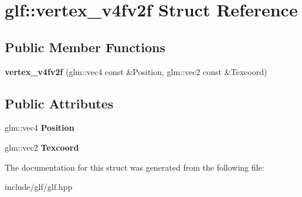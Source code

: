 \hypertarget{structglf_1_1vertex__v4fv2f}{\section{glf\-:\-:vertex\-\_\-v4fv2f \-Struct \-Reference}
\label{structglf_1_1vertex__v4fv2f}
}
\subsection*{\-Public \-Member \-Functions}
\begin{DoxyCompactItemize}
\item 
\hypertarget{structglf_1_1vertex__v4fv2f_a239189352f926b8360f0e5ea67ae71fe}{{\bfseries vertex\-\_\-v4fv2f} (glm\-::vec4 const \&\-Position, glm\-::vec2 const \&\-Texcoord)}\label{structglf_1_1vertex__v4fv2f_a239189352f926b8360f0e5ea67ae71fe}

\end{DoxyCompactItemize}
\subsection*{\-Public \-Attributes}
\begin{DoxyCompactItemize}
\item 
\hypertarget{structglf_1_1vertex__v4fv2f_a44febe63492ff5106d89332f3f814e70}{glm\-::vec4 {\bfseries \-Position}}\label{structglf_1_1vertex__v4fv2f_a44febe63492ff5106d89332f3f814e70}

\item 
\hypertarget{structglf_1_1vertex__v4fv2f_ac5c0129a38e461fc3e715d5de81c6023}{glm\-::vec2 {\bfseries \-Texcoord}}\label{structglf_1_1vertex__v4fv2f_ac5c0129a38e461fc3e715d5de81c6023}

\end{DoxyCompactItemize}


\-The documentation for this struct was generated from the following file\-:\begin{DoxyCompactItemize}
\item 
include/glf/glf.\-hpp\end{DoxyCompactItemize}
